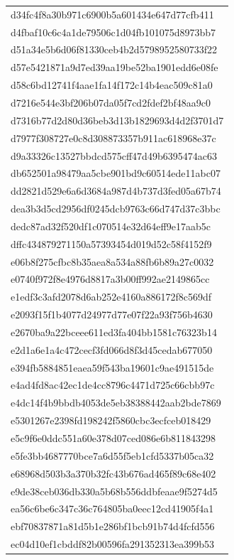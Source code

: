 \begin{tabular}{l}
d34fc4f8a30b971c6900b5a601434e647d77cfb411 \\
d4fbaf10c6c4a1de79506c1d04fb101075d8973bb7 \\
d51a34e5b6d06f81330ceb4b2d5798952580733f22 \\
d57e5421871a9d7ed39aa19be52ba1901edd6e08fe \\
d58c6bd12741f4aae1fa14f172c14b4eac509c81a0 \\
d7216e544e3bf206b07da05f7cd2fdef2bf48aa9c0 \\
d7316b77d2d80d36beb3d13b1829693d4d2f3701d7 \\
d7977f308727e0c8d308873357b911ac618968e37c \\
d9a33326c13527bbdcd575cff47d49b6395474ac63 \\
db652501a98479aa5cbe901bd9c60514ede11abc07 \\
dd2821d529e6a6d3684a987d4b737d3fed05a67b74 \\
dea3b3d5cd2956df0245dcb9763c66d747d37c3bbc \\
dedc87ad32f520df1c070514e32d64eff9e17aab5c \\
dffc434879271150a57393454d019d52c58f4152f9 \\
e06b8f275cfbc8b35aea8a534a88fb6b89a27c0032 \\
e0740f972f8e4976d8817a3b00ff992ae2149865cc \\
e1edf3c3afd2078d6ab252e4160a886172f8c569df \\
e2093f15f1b4077d24977d77e07f22a93f756b4630 \\
e2670ba9a22bceee611ed3fa404bb1581c76323b14 \\
e2d1a6e1a4c472cecf3fd066d8f3d45cedab677050 \\
e394fb5884851eaea59f543ba19601c9ae491515de \\
e4ad4fd8ac42ec1de4cc8796c4471d725c66cbb97c \\
e4dc14f4b9bbdb4053de5eb38388442aab2bde7869 \\
e5301267e2398fd198242f5860cbc3ecfceb018429 \\
e5c9f6e0ddc551a60e378d07ced086e6b811843298 \\
e5fe3bb4687770bce7a6d55f5eb1cfd5337b05ca32 \\
e68968d503b3a370b32fc43b676ad465f89c68e402 \\
e9de38ceb036db330a5b68b556ddbfeaae9f5274d5 \\
ea56c6be6c347c36c764805ba0eec12cd41905f4a1 \\
ebf70837871a81d5b1e286bf1bcb91b74d4fcfd556 \\
ec04d10ef1cbddf82b00596fa291352313ea399b53 \\

\end{tabular}
